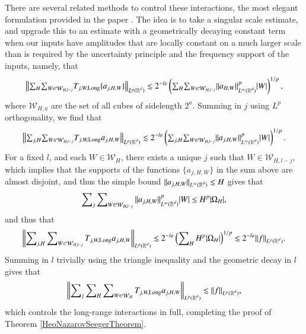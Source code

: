 There are several related methods to control these interactions, the most elegant formulation provided in the paper \cite{HeoandNazarovandSeeger2}. The idea is to take a singular scale estimate, and upgrade this to an estimate with a geometrically decaying constant term when our inputs have amplitudes that are locally constant on a much larger scale than is required by the uncertainty principle and the frequency support of the inputs, namely, that
%
\begin{equation}
  \left\| {\textstyle \sum\nolimits_H} {\textstyle \sum\nolimits_{W \in \mathcal{W}_{H,l-j}}} T_{j,W,\text{Long}} \{ a_{j,H,W} \} \right\|_{L^q(\operatorname{\mathbb{R}}^d)} \lesssim 2^{-l \varepsilon} \left( {\textstyle \sum\nolimits_H} {\textstyle \sum\nolimits_{W \in \mathcal{W}_{H,l-j}}} \| a_{H,W} \|_{L^\infty(\operatorname{\mathbb{R}}^d)}^p |W| \right)^{1/p},
\end{equation}
%
where $\mathcal{W}_{H,a}$ are the set of all cubes of sidelength $2^a$. Summing in $j$ using $L^p$ orthogonality, we find that
%
\begin{equation}
  \left\| {\textstyle \sum\nolimits_{j,H}} {\textstyle \sum\nolimits_{W \in \mathcal{W}_{H,l-j}}} T_{j,W,\text{Long}} a_{j,H,W} \right\|_{L^p(\operatorname{\mathbb{R}}^d)} \lesssim 2^{-l \varepsilon} \left( {\textstyle \sum\nolimits_{j,H}} {\textstyle \sum\nolimits_{W \in \mathcal{W}_{H,l-j}}} \| a_{j,H,W} \|_{L^\infty(\operatorname{\mathbb{R}}^d)}^p |W| \right)^{1/p}.
\end{equation}
%
For a fixed $l$, and each $W \in \mathcal{W}_H$, there exists a unique $j$ such that $W \in \mathcal{W}_{H,l-j}$, which implies that the supports of the functions $\{ a_{j,H,W} \}$ in the sum above are almost disjoint, and thus the simple bound $\| a_{j,H,W} \|_{L^\infty(\operatorname{\mathbb{R}}^d)} \lesssim H$ gives that
%
\begin{equation}
  \sum\nolimits_j \sum\nolimits_{W \in \mathcal{W}_{H,l-j}} \| a_{j,H,W} \|_{L^\infty(\operatorname{\mathbb{R}}^d)}^p |W| \leq H^p |\Omega_H|,
\end{equation}
%
and thus that
%
\begin{equation}
  \left\| \sum\nolimits_{j,H} \sum\nolimits_{W \in \mathcal{W}_{H,l-j}} T_{j,W,\text{Long}} a_{j,H,W} \right\|_{L^p(\operatorname{\mathbb{R}}^d)} \lesssim 2^{-l \varepsilon} \left( \sum\nolimits_H H^p |\Omega_H| \right)^{1/p} \lesssim 2^{-l\varepsilon} \| f \|_{L^p(\operatorname{\mathbb{R}}^d)}.
\end{equation}
%
Summing in $l$ trivially using the triangle inequality and the geometric decay in $l$ gives that
%
\begin{equation}
  \left\| \sum\nolimits_j \sum\nolimits_H \sum\nolimits_{W \in \mathcal{W}_{H}} T_{j,W,\text{Long}} a_{j,H,W} \right\|_{L^p(\operatorname{\mathbb{R}}^d)} \lesssim \| f \|_{L^p(\operatorname{\mathbb{R}}^d)},
\end{equation}
%
which controls the long-range interactions in full, completing the proof of Theorem \ref{HeoNazarovSeegerTheorem}.


